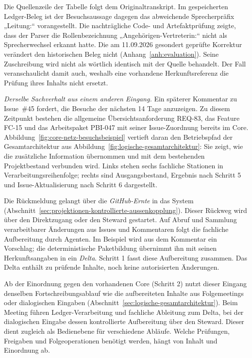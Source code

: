 Die Quellenzeile der Tabelle folgt dem Originaltranskript. Im
gespeicherten Ledger-Beleg ist der Besuchsaussage dagegen das
abweichende Sprecherpräfix „Leitung:`` vorangestellt. Die nachträgliche
Code- und Artefaktprüfung zeigte, dass der Parser die Rollenbezeichnung
„Angehörigen-Vertreterin:`` nicht als Sprecherwechsel erkannt hatte.
Die am 11.09.2026 gesondert geprüfte Korrektur verändert den
historischen Beleg nicht (Anhang~\ref{anh:evaluation}). Seine
Zuschreibung wird nicht als wörtlich identisch mit der Quelle
behandelt. Der Fall veranschaulicht damit auch, weshalb eine
vorhandene Herkunftsreferenz die Prüfung ihres Inhalts nicht ersetzt.

\emph{Derselbe Sachverhalt aus einem anderen Eingang.}
Ein späterer Kommentar zu Issue~\#45 fordert, die Besuche der nächsten
14 Tage anzuzeigen. Zu diesem Zeitpunkt bestehen die allgemeine
Übersichtsanforderung REQ-83, das Feature FC-15 und das Arbeitspaket
PBI-047 mit seiner Issue-Zuordnung bereits im Core.
Abbildung~\ref{fig:core-netz-besuchsbeispiel} vertieft daran den
Betriebspfad der Gesamtarchitektur aus
Abbildung~\ref{fig:logische-gesamtarchitektur}: Sie zeigt, wie die
zusätzliche Information übernommen und mit dem bestehenden
Projektbestand verbunden wird. Links stehen sechs fachliche
Stationen in Verarbeitungsreihenfolge; rechts sind Ausgangsbestand,
Ergebnis nach Schritt 5 und Issue-Aktualisierung nach Schritt 6
dargestellt.

Die Rückmeldung gelangt über die \emph{GitHub-Ernte} in das System
(Abschnitt~\ref{sec:projektionen-kontrollierte-aussenkopplung}).
Dieser Rückweg wird über den Direktzugang oder den Steward gestartet.
Auf Abruf und Sammlung verarbeitbarer Änderungen aus Issues und
Kommentaren folgt die fachliche Aufbereitung durch Agenten.
Im Beispiel wird aus dem Kommentar ein Vorschlag; die deterministische
Paketbildung übernimmt ihn mit seinen Herkunftsangaben in ein
\emph{Delta}. Schritt 1 fasst diese Aufbereitung zusammen.
Das Delta enthält zu prüfende Inhalte, noch keine autorisierten
Änderungen.

Ab der Einordnung gegen den vorhandenen Core (Schritt 2) nutzt dieser
Eingang denselben Fortschreibungsablauf wie die aufbereiteten Inhalte
aus Folgemeetings oder dialogischen Eingaben
(Abschnitt~\ref{sec:logische-gesamtarchitektur}). Beim Meeting führen
Ledger-Verarbeitung und fachliche Ableitung zum Delta, bei der
dialogischen Eingabe dessen kontrollierte Aufbereitung über den
Steward. Dieser dient zugleich als Bedienebene für verschiedene
Abläufe. Welche Prüfungen, Freigaben und Folgeoperationen benötigt
werden, hängt von Inhalt und Einordnung ab.

